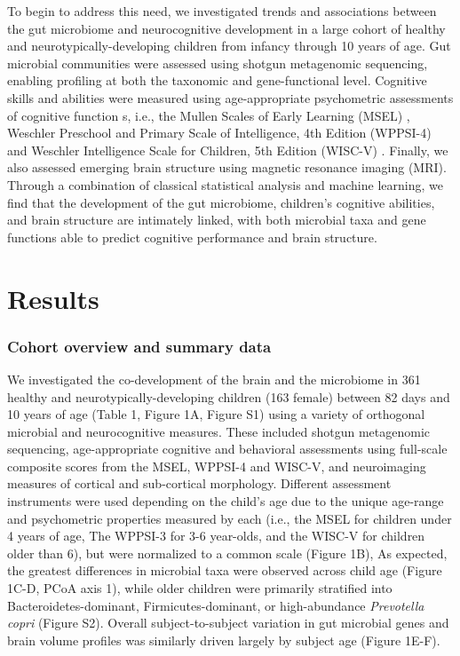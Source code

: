 \documentclass{article}
\begin{document}
To begin to address this need, we investigated trends and associations between
the gut microbiome and
neurocognitive development in a large cohort of healthy and neurotypically-developing
children from infancy through 10 years of age. Gut microbial
communities were assessed using shotgun metagenomic sequencing, enabling
profiling at both the taxonomic and gene-functional level.
Cognitive skills and abilities were measured using age-appropriate
psychometric assessments of cognitive function s, i.e.,
the Mullen Scales of Early Learning (MSEL) \cite{mullenMullenScalesEarly1995},
Weschler Preschool and Primary Scale of Intelligence, 4th Edition (WPPSI-4) 
\cite{wechslerWechslerPreschoolPrimary2012}
and Weschler Intelligence Scale for Children, 5th Edition (WISC-V)
\cite{wechslerWechslerIntelligenceScale1949}.
Finally, we also assessed emerging brain structure using magnetic resonance imaging
(MRI). Through a combination of classical statistical analysis and machine
learning, we find that the development of the gut microbiome,
children's cognitive abilities, and brain structure are intimately linked, with
both microbial taxa and gene functions able to predict cognitive
performance and brain structure.

\section*{Results}

\subsubsection*{Cohort overview and summary data}

We investigated the co-development of the brain and the microbiome in
361 healthy and neurotypically-developing children (163 female) between 82 days and 10 years of age
(Table 1,  Figure 1A, Figure S1)
using a variety of orthogonal microbial and neurocognitive measures.
These included shotgun metagenomic sequencing,
age-appropriate cognitive and behavioral assessments
using full-scale composite scores from the MSEL, WPPSI-4 and WISC-V,
and neuroimaging measures of cortical and sub-cortical morphology. 
Different assessment instruments were used depending on the child's age
due to the unique age-range and psychometric properties measured by each
(i.e., the MSEL for children under 4 years of age, The WPPSI-3 for 3-6 year-olds,
and the WISC-V for children older than 6), but were normalized to a common scale (Figure 1B),
As expected, the greatest differences in microbial taxa were observed across
child age (Figure 1C-D, PCoA axis 1), while older children were primarily
stratified into Bacteroidetes-dominant, Firmicutes-dominant, or
high-abundance \emph{Prevotella copri} (Figure S2).
Overall subject-to-subject variation in gut microbial genes
and brain volume profiles was similarly driven largely by subject age (Figure 1E-F).
\end{document}

